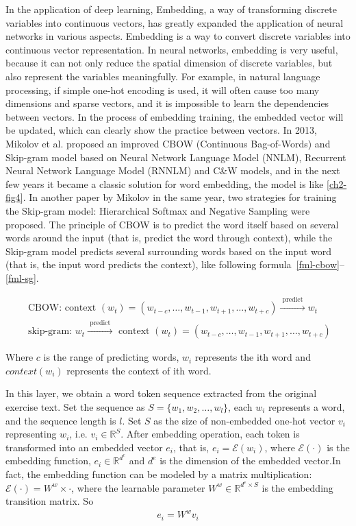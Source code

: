 In the application of deep learning, Embedding, a way of transforming discrete variables into continuous vectors, has greatly expanded the application of neural networks in various aspects. Embedding is a way to convert discrete variables into continuous vector representation. In neural networks, embedding is very useful, because it can not only reduce the spatial dimension of discrete variables, but also represent the variables meaningfully. For example, in natural language processing, if simple one-hot encoding is used, it will often cause too many dimensions and sparse vectors, and it is impossible to learn the dependencies between vectors. In the process of embedding training, the embedded vector will be updated, which can clearly show the practice between vectors. In 2013, Mikolov et al. proposed an improved CBOW (Continuous Bag-of-Words) and Skip-gram model based on Neural Network Language Model (NNLM)\cite{bengio2003neural}, Recurrent Neural Network Language Model (RNNLM) \cite{mikolov2011extensions} and C\&W models\cite{mikolov2013efficient}, and in the next few years it became a classic solution for word embedding, the model is like \figurename{\ref{ch2-fig4}}. In another paper by Mikolov in the same year, two strategies for training the Skip-gram model: Hierarchical Softmax and Negative Sampling were proposed\cite{mikolov2013distributed}. The principle of CBOW is to predict the word itself based on several words around the input (that is, predict the word through context), while the Skip-gram model predicts several surrounding words based on the input word (that is, the input word predicts the context), like following formula~\ref{fml-cbow}--\ref{fml-sg}.

\begin{align}
	\text{ CBOW: context }(w_{t})=(w_{t-c}, \ldots, w_{t-1}, w_{t+1}, \ldots, w_{t+c}) \stackrel{\text{ predict }}{\longrightarrow} w_{t} \label{fml-cbow} \\
	\text{ skip-gram: } w_{t} \stackrel{\text{ predict }}{\longrightarrow} \text{ context }(w_{t})=(w_{t-c}, \ldots, w_{t-1}, w_{t+1}, \ldots, w_{t+c}) \label{fml-sg}
\end{align}

Where \(c\) is the range of predicting words, \(w_i\) represents the ith word and \(context(w_i)\) represents the context of ith word.

In this layer, we obtain a word token sequence extracted from the original exercise text. Set the sequence as \(S=\{w_1,w_2,\ldots,w_l\} \), each \(w_i\) represents a word, and the sequence length is \(l\). Set \(S\) as the size of non-embedded one-hot vector \(v_i\) representing \(w_i\), i.e. \(v_i\in \mathbb{R}^{S}\). After embedding operation, each token is transformed into an embedded vector \(e_i\), that is, \(e_i=\mathcal{E}(w_i)\), where \(\mathcal{E}(\cdot)\) is the embedding function, \(e_i\in \mathbb{R}^{d^{e}}\) and \(d^e\) is the dimension of the embedded vector.In fact, the embedding function can be modeled by a matrix multiplication: \(\mathcal {E} (\cdot) = W^w\times \cdot \), where the learnable parameter \(W^w\in \mathbb {R} ^ {d^{e}\times S}\) is the embedding transition matrix. So
\begin{align}
	e_i = W^w v_i
\end{align}

